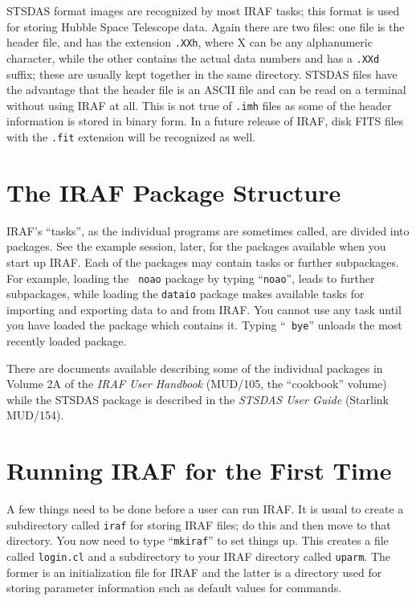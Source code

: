 STSDAS format images are recognized by most IRAF tasks;  this format is
used for storing Hubble Space Telescope data.  Again there are two
files:  one file is the
header file, and has the extension {\tt .XXh}, where X can be any
alphanumeric character, while the other contains the actual data
numbers and has a {\tt .XXd} suffix;  these are usually kept together
in the same directory. STSDAS files have the advantage that the header
file is an ASCII file and can be read on a terminal without using IRAF
at all. This is not true of {\tt .imh} files as some of the header
information is stored in binary form. In a future release of IRAF,
disk FITS files with the {\tt .fit} extension will be recognized as
well.

\section{The IRAF Package Structure}

IRAF's ``tasks'', as the individual programs are sometimes called,
are divided into packages. See the example session, later, for the
packages available when you start up IRAF. Each of the packages may
contain tasks or further subpackages. For example, loading the {\tt
noao} package by typing ``{\tt noao}'', leads to further subpackages,
while loading the {\tt dataio} package makes available tasks for
importing and exporting data to and from IRAF. You cannot use any task
until you have loaded the package which contains it. Typing ``{\tt
bye}'' unloads the most recently loaded package.

There are documents available describing some of the individual
packages in Volume 2A of the {\it IRAF User Handbook}\/ (MUD/105,
the ``cookbook'' volume) while the STSDAS package is described
in the {\it STSDAS User Guide}\/ (Starlink MUD/154). 

\section{Running IRAF for the First Time}

A few things need to be done before a user can run IRAF. It is usual
to create a subdirectory called {\tt iraf} for storing IRAF files; do
this and then move to that directory. You now need to type ``{\tt mkiraf}'' to
set things up. This creates a file called {\tt login.cl} and a
subdirectory to your IRAF directory called {\tt uparm}. The former is
an initialization file for IRAF and the latter is a directory used for
storing parameter information such as default values for commands. 

